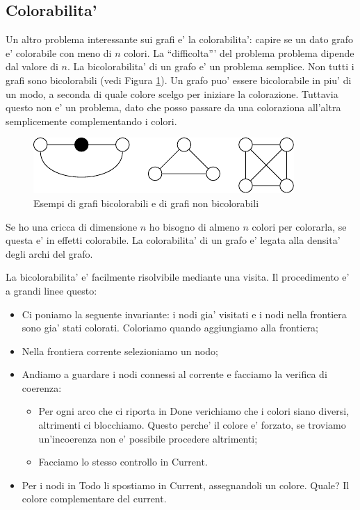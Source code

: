 \subsection{Colorabilita'}

Un altro problema interessante sui grafi e' la colorabilita': capire se un dato grafo e' colorabile
con meno di $n$ colori. La ``difficolta''' del problema problema dipende dal valore di $n$. La
bicolorabilita' di un grafo e' un problema semplice. Non tutti i grafi sono bicolorabili (vedi
Figura \ref{TwoColorableGraphs}). Un grafo puo' essere bicolorabile in piu' di un modo, a seconda di
quale colore scelgo per iniziare la colorazione. Tuttavia questo non e' un problema, dato che posso
passare da una coloraziona all'altra semplicemente complementando i colori.

\begin{figure}[h]
    \begin{center}
        \includegraphics{img/2ColorableGraphs.pdf}
    \end{center}
    \caption{Esempi di grafi bicolorabili e di grafi non bicolorabili}
    \label{TwoColorableGraphs}
\end{figure}

Se ho una cricca di dimensione $n$ ho bisogno di almeno $n$ colori per colorarla, se questa e' in
effetti colorabile. La colorabilita' di un grafo e' legata alla densita' degli archi del grafo.

La bicolorabilita' e' facilmente risolvibile mediante una visita. Il procedimento e' a grandi linee
questo:
\begin{itemize}
    \item Ci poniamo la seguente invariante: i nodi gia' visitati e i nodi nella frontiera sono gia'
    stati colorati. Coloriamo quando aggiungiamo alla frontiera;
    \item Nella frontiera corrente selezioniamo un nodo;
    \item Andiamo a guardare i nodi connessi al corrente e facciamo la verifica di coerenza:
    \begin{itemize}
        \item Per ogni arco che ci riporta in Done verichiamo che i colori siano diversi, altrimenti
        ci blocchiamo. Questo perche' il colore e' forzato, se troviamo un'incoerenza non e'
        possibile procedere altrimenti;
        \item Facciamo lo stesso controllo in Current.
    \end{itemize}
    \item Per i nodi in Todo li spostiamo in Current, assegnandoli un colore. Quale? Il colore
    complementare del current.
\end{itemize}

